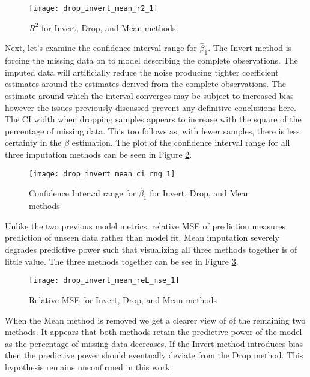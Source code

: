 \documentclass[../paper.tex]{subfiles}
\begin{document}
\begin{figure}[H]
\centering
\texttt{[image: drop\_invert\_mean\_r2\_1]}
\caption{$R^2$ for Invert, Drop, and Mean methods}
\label{fig:drop_invert_mean_r2_1}
\end{figure}

Next, let's examine the confidence interval range for $\hat{\beta}_{1}$. The Invert method is forcing the missing data on to model describing the complete observations. The imputed data will artificially reduce the noise producing tighter coefficient estimates around the estimates derived from the complete observations. The estimate around which the interval converges may be subject to increased bias however the issues previously discussed prevent any definitive conclusions here.
The CI width when dropping samples appears to increase with the square of the percentage of missing data. This too follows as, with fewer samples, there is less certainty in the $\beta$ estimation. The plot of the confidence interval range for all three imputation methods can be seen in Figure \ref{fig:drop_invert_mean_c1_rng_1}.

\begin{figure}[H]
\centering
\texttt{[image: drop\_invert\_mean\_ci\_rng\_1]}
\caption{Confidence Interval range for $\hat{\beta}_{1}$ for Invert, Drop, and Mean methods}
\label{fig:drop_invert_mean_c1_rng_1}
\end{figure}

Unlike the two previous model metrics, relative MSE of prediction measures prediction of unseen data rather than model fit. Mean imputation severely degrades predictive power such that visualizing all three methods together is of little value. The three methods together can be see in Figure \ref{fig:drop_invert_mean_rel_mse_1}.

\begin{figure}[H]
\centering
\texttt{[image: drop\_invert\_mean\_reL\_mse\_1]}
\caption{Relative MSE for Invert, Drop, and Mean methods}
\label{fig:drop_invert_mean_rel_mse_1}
\end{figure}

When the Mean method is removed we get a clearer view of of the remaining two methods.
It appears that both methods retain the predictive power of the model as the percentage of missing data decreases.
If the Invert method introduces bias then the predictive power should eventually deviate from the Drop method.
This hypothesis remains unconfirmed in this work.
\end{document}
